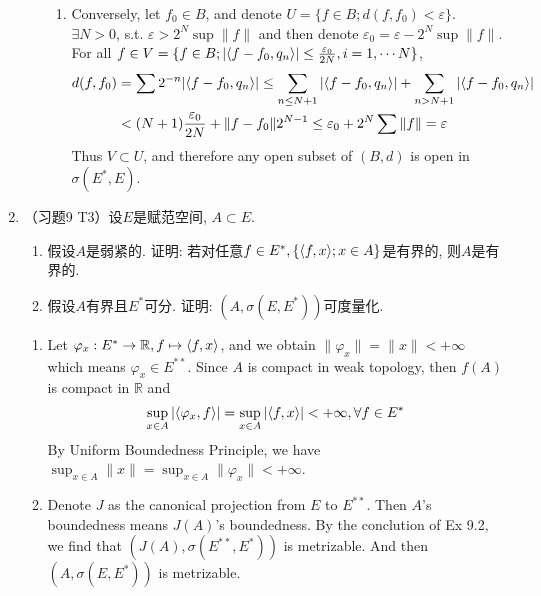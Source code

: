 \begin{enumerate}
\begin{answer}
\begin{enumerate}
\begin{enumerate}
            \item Conversely, let $f_0\in B$, and denote $U = \{ f\in B; d(f, f_0) < \varepsilon\}$. $\exists N > 0$, s.t. $\varepsilon > 2^N\sup\|f\|$ and then denote $\varepsilon_0 = \varepsilon - 2^N\sup\|f\|$. For all $f\in V = \{f\in B; |\langle f-f_0,q_n\rangle|\leq \frac{\varepsilon_0}{2N}, i = 1, \cdots N\}$,
            \[ \begin{aligned}
                d(f, f_0) &= \sum2^{-n} |\langle f-f_0,q_n\rangle| \leq \sum_{n \leq N+1} |\langle f-f_0,q_n\rangle| +  \sum_{n > N+1}|\langle f-f_0,q_n\rangle|\\
                &< (N+1) \frac{\varepsilon_0}{2N} + \|f - f_0\| 2^{N-1}\leq \varepsilon_0 + 2^N\sum\|f\|=\varepsilon
            \end{aligned}\]
            Thus $V\subset U$, and therefore any open subset of $(B, d)$ is open in $\sigma(E^*, E)$.
        \end{enumerate}
    \end{enumerate}
    \end{answer}
  \item （习题9 T3）设$E$是赋范空间, $A\subset E$. 
    \begin{enumerate}
      \item 假设$A$是弱紧的. 证明: 若对任意$f\in E^*, \{\langle f,x\rangle; x\in A\}$是有界的, 则$A$是有界的.
      \item 假设$A$有界且$E^*$可分. 证明: $(A, \sigma(E, E^*))$可度量化.
    \end{enumerate}
    \begin{answer}
      \begin{enumerate}
        \item Let $\varphi_x : E^*\to \mathbb R,f\mapsto \langle f,x\rangle$, and we obtain $\|\varphi_x\| = \|x\| < +\infty$ which means $\varphi_x\in E^{**}$. Since $A$ is compact in weak topology, then $f(A)$ is compact in $\mathbb R$ and
        \[ \sup_{x\in A}|\langle\varphi_x,f\rangle| = \sup_{x\in A} |\langle f,x\rangle| < +\infty, \forall f \in E^* \]
        By Uniform Boundedness Principle, we have $\sup_{x\in A}\|x\| = \sup_{x\in A} \|\varphi_x\| < +\infty$.
        \item Denote $J$ as the canonical projection from $E$ to $E^{**}$. Then $A$'s boundedness means $J(A)$'s boundedness. By the conclution of Ex 9.2, we find that $(J(A), \sigma(E^{**}, E^{*}))$ is metrizable. And then $(A, \sigma(E, E^*))$ is metrizable.
      \end{enumerate}
    \end{answer}

\end{enumerate}
